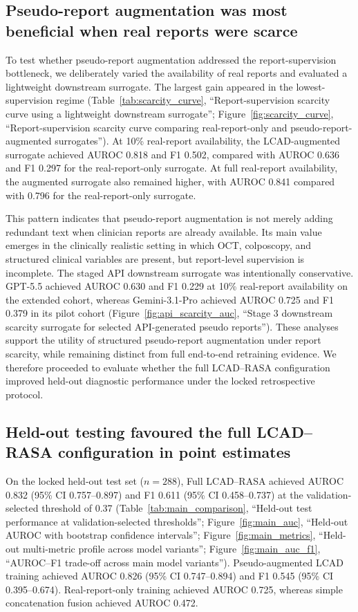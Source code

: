 \subsection{Pseudo-report augmentation was most beneficial when real reports were scarce}
\label{subsec:scarcity_results}

To test whether pseudo-report augmentation addressed the report-supervision bottleneck, we deliberately varied the availability of real reports and evaluated a lightweight downstream surrogate. The largest gain appeared in the lowest-supervision regime (Table~\ref{tab:scarcity_curve}, ``Report-supervision scarcity curve using a lightweight downstream surrogate''; Figure~\ref{fig:scarcity_curve}, ``Report-supervision scarcity curve comparing real-report-only and pseudo-report-augmented surrogates''). At 10\% real-report availability, the LCAD-augmented surrogate achieved AUROC 0.818 and F1 0.502, compared with AUROC 0.636 and F1 0.297 for the real-report-only surrogate. At full real-report availability, the augmented surrogate also remained higher, with AUROC 0.841 compared with 0.796 for the real-report-only surrogate.

This pattern indicates that pseudo-report augmentation is not merely adding redundant text when clinician reports are already available. Its main value emerges in the clinically realistic setting in which OCT, colposcopy, and structured clinical variables are present, but report-level supervision is incomplete. The staged API downstream surrogate was intentionally conservative. GPT-5.5 achieved AUROC 0.630 and F1 0.229 at 10\% real-report availability on the extended cohort, whereas Gemini-3.1-Pro achieved AUROC 0.725 and F1 0.379 in its pilot cohort (Figure~\ref{fig:api_scarcity_auc}, ``Stage 3 downstream scarcity surrogate for selected API-generated pseudo reports''). These analyses support the utility of structured pseudo-report augmentation under report scarcity, while remaining distinct from full end-to-end retraining evidence. We therefore proceeded to evaluate whether the full LCAD--RASA configuration improved held-out diagnostic performance under the locked retrospective protocol.

\subsection{Held-out testing favoured the full LCAD--RASA configuration in point estimates}
\label{subsec:diagnostic_results}

On the locked held-out test set ($n=288$), Full LCAD--RASA achieved AUROC 0.832 (95\% CI 0.757--0.897) and F1 0.611 (95\% CI 0.458--0.737) at the validation-selected threshold of 0.37 (Table~\ref{tab:main_comparison}, ``Held-out test performance at validation-selected thresholds''; Figure~\ref{fig:main_auc}, ``Held-out AUROC with bootstrap confidence intervals''; Figure~\ref{fig:main_metrics}, ``Held-out multi-metric profile across model variants''; Figure~\ref{fig:main_auc_f1}, ``AUROC--F1 trade-off across main model variants''). Pseudo-augmented LCAD training achieved AUROC 0.826 (95\% CI 0.747--0.894) and F1 0.545 (95\% CI 0.395--0.674). Real-report-only training achieved AUROC 0.725, whereas simple concatenation fusion achieved AUROC 0.472.

